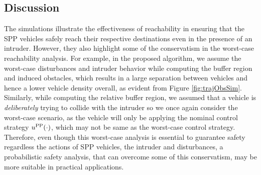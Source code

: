 \subsection{Discussion \label{sec:discuss}}
The simulations illustrate the effectiveness of reachability in ensuring that the SPP vehicles safely reach their respective destinations even in the presence of an intruder. However, they also highlight some of the conservatism in the worst-case reachability analysis. For example, in the proposed algorithm, we assume the worst-case disturbances and intruder behavior while computing the buffer region and induced obstacles, which results in a large separation between vehicles and hence a lower vehicle density overall, as evident from Figure \ref{fig:trajObsSim}. Similarly, while computing the relative buffer region, we assumed that a vehicle is \textit{deliberately} trying to collide with the intruder so we once again consider the worst-case scenario, as the vehicle will only be applying the nominal control strategy $u^{\text{PP}}(\cdot)$, which may not be same as the worst-case control strategy. Therefore, even though this worst-case analysis is essential to guarantee safety regardless the actions of SPP vehicles, the intruder and disturbances, a probabilistic safety analysis, that can overcome some of this conservatism, may be more suitable in practical applications. 